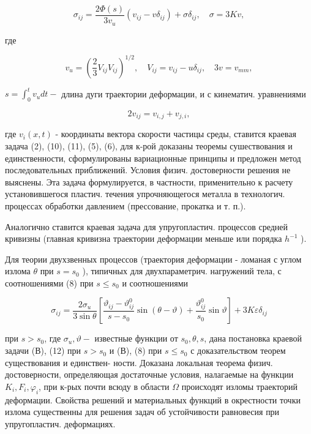 \documentclass[10pt]{article}
\begin{document}
\[

\sigma_{i j}=\frac{2 \Phi(s)}{3 v_{u}}\left(v_{i j}-v \delta_{i j}\right)+\sigma \delta_{i j}, \quad \sigma=3 K v,

\]



где



\[

v_{u}=\left(\frac{2}{3} V_{i j} V_{i j}\right)^{1 / 2}, \quad V_{i j}=v_{i j}-u \delta_{i j}, \quad 3 v=v_{m m},

\]



$s=\int_{0}^{t} v_{u} d t-$ длина дуги траектории деформации, и с кинематич. уравнениями



\[

2 v_{i j}=v_{i, j}+v_{j, i},

\]



где $v_{i}(x, t)$ - координаты вектора скорости частицы среды, ставится краевая задача (2), (10), (11), (5), (6), для к-рой доказаны теоремы сушествования и единственности, сформулированы вариационные принципы и предложен метод последовательных приближений. Условия физич. достоверности решения не выяснены. Эта задача формулируется, в частности, применительно к расчету установившегося пластич. течения упрочняющегося металла в технологич. процессах обработки давлением (прессование, прокатка и т. п.).



Аналогично ставится краевая задача для упругопластич. процессов средней кривизны (главная кривизна траектории деформации меньше или порядка $h^{-1}$ ).



Для теории двухзвенных процессов (траектория деформации - ломаная с углом излома $\theta$ при $s=s_{0}$ ), типичных для двухпараметрич. нагружений тела, с соотношениями (8) при $s \leqslant s_{0}$ и соотношениями



\[

\sigma_{i j}=\frac{2 \sigma_{u}}{3 \sin \theta}\left[\frac{\vartheta_{i j}-\vartheta_{i j}^{0}}{s-s_{0}} \sin (\theta-\vartheta)+\frac{\vartheta_{i j}^{0}}{s_{0}} \sin \vartheta\right]+3 K \varepsilon \delta_{i j}

\]



при $s>s_{0}$, где $\sigma_{u}, \vartheta-$ известные функции от $s_{0}, \theta, s$, дана постановка краевой задачи (В), (12) при $s>s_{0}$ и (В), (8) при $s \leqslant s_{0}$ с доказательством теорем существования и единствен- ности. Доказана локальная теорема физич. достоверности, определяющая достаточные условия, налагаемые на функции $K_{i}, F_{i}, \varphi_{i}$, при к-рых почти всюду в области $\Omega$ происходят изломы траекторий деформации. Свойства решений и материальных функций в окрестности точки излома существенны для решения задач об устойчивости равновесия при упругопластич. деформациях.
\end{document}
